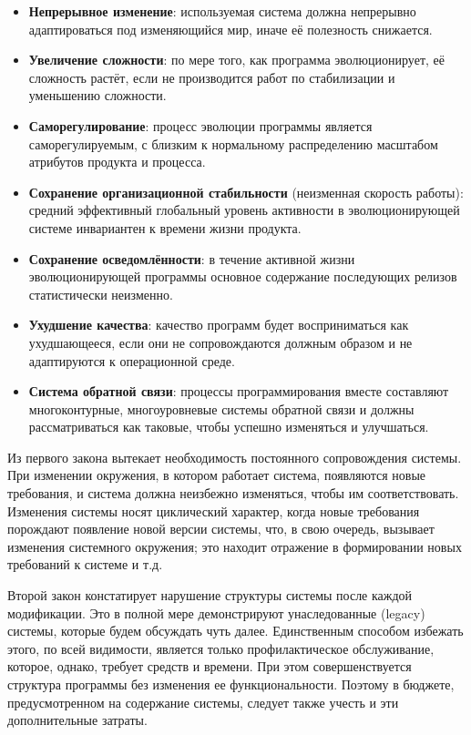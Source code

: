 \documentclass{../../text-style}
\begin{document}
\begin{itemize}
    \item \textbf{Непрерывное изменение}: используемая система должна непрерывно адаптироваться под изменяющийся мир, иначе её полезность снижается.
    \item \textbf{Увеличение сложности}: по мере того, как программа эволюционирует, её сложность растёт, если не производится работ по стабилизации и уменьшению сложности.
    \item \textbf{Саморегулирование}: процесс эволюции программы является саморегулируемым, с близким к нормальному распределению масштабом атрибутов продукта и процесса.
    \item \textbf{Сохранение организационной стабильности} (неизменная скорость работы): средний эффективный глобальный уровень активности в эволюционирующей системе инвариантен к времени жизни продукта.
    \item \textbf{Сохранение осведомлённости}: в течение активной жизни эволюционирующей программы основное содержание последующих релизов статистически неизменно.
    \item \textbf{Ухудшение качества}: качество программ будет восприниматься как ухудшающееся, если они не сопровождаются должным образом и не адаптируются к операционной среде.
    \item \textbf{Система обратной связи}: процессы программирования вместе составляют многоконтурные, многоуровневые системы обратной связи и должны рассматриваться как таковые, чтобы успешно изменяться и улучшаться.
\end{itemize}

Из первого закона вытекает необходимость постоянного сопровождения системы. При изменении окружения, в котором работает система, появляются новые требования, и система должна неизбежно изменяться, чтобы им соответствовать. Изменения системы носят циклический характер, когда новые требования порождают появление новой версии системы, что, в свою очередь, вызывает изменения системного окружения; это находит отражение в формировании новых требований к системе и т.д.

Второй закон констатирует нарушение структуры системы после каждой модификации. Это в полной мере демонстрируют унаследованные (legacy) системы, которые будем обсуждать чуть далее. Единственным способом избежать этого, по всей видимости, является только профилактическое обслуживание, которое, однако, требует средств и времени. При этом совершенствуется структура программы без изменения ее функциональности. Поэтому в бюджете, предусмотренном на содержание системы, следует также учесть и эти дополнительные затраты.
\end{document}
